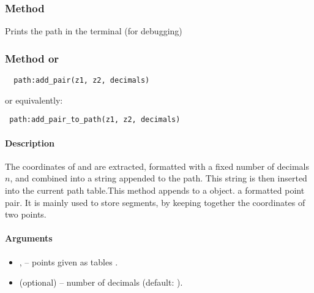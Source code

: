 \begin{tkzexample}[latex=.3\textwidth]
\end{tkzexample}


\subsubsection{Method }
\label{ssub:method_tkzmeth_path_show}

Prints the path in the terminal (for debugging)

\begin{tkzexample}[latex=.45\textwidth]
\end{tkzexample}

\subsubsection{Method  or }
\label{ssub:subsubsection_name}
\begin{verbatim}
  path:add_pair(z1, z2, decimals)
\end{verbatim}

or equivalently:

\begin{verbatim}
 path:add_pair_to_path(z1, z2, decimals)
\end{verbatim}

\paragraph{Description}
 The coordinates of  and  are extracted, formatted with a fixed number of decimals $n$, and combined into a string  appended to the path.
This string is then inserted into the current path table.This method appends to a  object. a formatted point pair.
It is mainly used to store segments, by keeping together the coordinates of two points.



\paragraph{Arguments}
\begin{itemize}
  \item {},  – points given as tables .
  \item {} (optional) – number of decimals (default: ).
\end{itemize}

